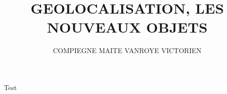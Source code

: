 \documentclass[10pt,a4paper]{article}
\author{COMPIEGNE MAITE VANROYE VICTORIEN}
\title{GEOLOCALISATION, LES NOUVEAUX OBJETS}
\begin{document}
Test
\end{document}
